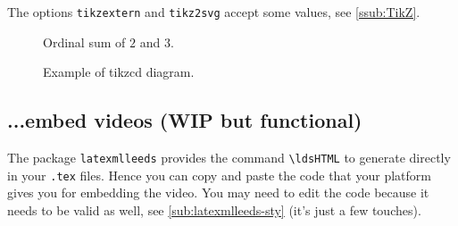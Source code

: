 \documentclass[a4paper]{article}
\def\ltxinline{\lstinline[style=latexml,frame=none]}
\theoremstyle{definition}
\begin{document}
The options \verb|tikzextern| and \verb|tikz2svg| accept some values, see \autoref{ssub:TikZ}.

\begin{figure}
  \begin{center}
  \end{center}
  \caption{Ordinal sum of $2$ and $3$.}
  \label{fig:tikz-example}
\end{figure}

\begin{figure}
  \begin{center}
  \end{center}
  \caption{Example of tikzcd diagram.}
  \label{fig:tikzcd-example}
\end{figure}

\subsection{...embed videos (WIP but functional)}
The package \verb|latexmlleeds| provides the command \ltxinline|\ldsHTML| to generate \HTML{} directly in your \verb|.tex| files. Hence you can copy and paste the \HTML{} code that your platform gives you for embedding the video. You may need to edit the \HTML{} code because it needs to be valid \XML{} as well, see \autoref{sub:latexmlleeds-sty} (it's just a few touches).
\end{document}
